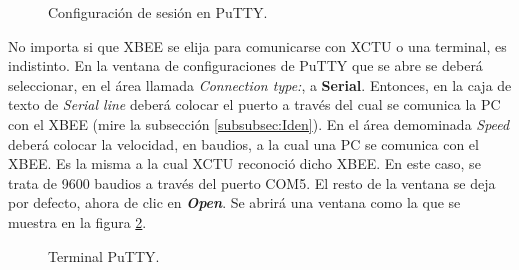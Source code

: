 \begin{figure}[H] %
\caption[1]{Configuración de sesión en PuTTY.}
\label{fig:Pu}
\end{figure}

No importa si que XBEE se elija para comunicarse con XCTU o una terminal, es indistinto. En la ventana de configuraciones de PuTTY que se abre se deberá seleccionar, en el área llamada \textit{Connection type:}, a \textbf{Serial}. Entonces, en la caja de texto de \textit{Serial line} deberá colocar el puerto a través del cual se comunica la PC con el XBEE (mire la subsección \ref{subsubsec:Iden}). En el área demominada \textit{Speed} deberá colocar la velocidad, en baudios, a la cual una PC se comunica con el XBEE. Es la misma a la cual XCTU reconoció dicho XBEE. En este caso, se trata de 9600 baudios a través del puerto COM5. El resto de la ventana se deja por defecto, ahora de clic en \textit{\textbf{Open}}. Se abrirá una ventana como la que se muestra en la figura \ref{fig:PuttCon}.

\begin{figure}[H] %
\caption[1]{Terminal PuTTY.}
\label{fig:PuttCon}
\end{figure}


